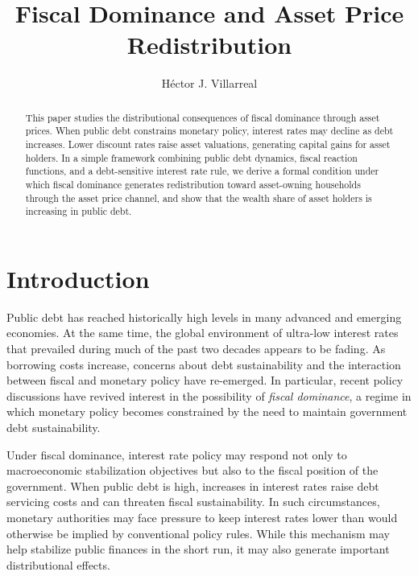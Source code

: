 \documentclass[3p]{elsarticle}
\begin{document}
\title{Fiscal Dominance and Asset Price Redistribution}

\author{H\'ector J. Villarreal}
\address{Tec de Monterrey}

\begin{abstract}
This paper studies the distributional consequences of fiscal dominance through asset prices.
When public debt constrains monetary policy, interest rates may decline as debt increases.
Lower discount rates raise asset valuations, generating capital gains for asset holders.
In a simple framework combining public debt dynamics, fiscal reaction functions, and a
debt-sensitive interest rate rule, we derive a formal condition under which fiscal dominance
generates redistribution toward asset-owning households through the asset price channel,
and show that the wealth share of asset holders is increasing in public debt.
\end{abstract}

\maketitle

\section{Introduction}

Public debt has reached historically high levels in many advanced and emerging economies.
At the same time, the global environment of ultra-low interest rates that prevailed during
much of the past two decades appears to be fading. As borrowing costs increase, concerns
about debt sustainability and the interaction between fiscal and monetary policy have
re-emerged. In particular, recent policy discussions have revived interest in the possibility
of \emph{fiscal dominance}, a regime in which monetary policy becomes constrained by the
need to maintain government debt sustainability.

Under fiscal dominance, interest rate policy may respond not only to macroeconomic
stabilization objectives but also to the fiscal position of the government. When public
debt is high, increases in interest rates raise debt servicing costs and can threaten
fiscal sustainability. In such circumstances, monetary authorities may face pressure to
keep interest rates lower than would otherwise be implied by conventional policy rules.
While this mechanism may help stabilize public finances in the short run, it may also
generate important distributional effects.
\end{document}

